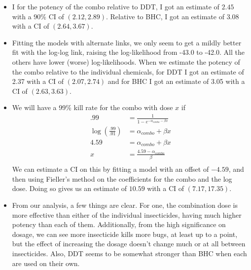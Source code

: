 \documentclass[11pt]{article}
\theoremstyle{definition}
\begin{document}
\begin{itemize}
\begin{itemize}
\[\begin{array}{cccc}
                                             1 & 0 & 1 & 0 \\
                                             0 & 0 & 0 & 1 \\
                           \end{array}\right] = \Sigma_2 \]
                The matrix is, of course, the linear transformation to turn the first space into the second.       
            \item[(e)]
                I for the potency of the combo relative to DDT, I got an estimate of $2.45$ with a $90\%$ CI of \((2.12,2.89)\). Relative to BHC, I got an estimate of $3.08$ with a CI of \((2.64,3.67)\).
            \item[(f)]
                Fitting the models with alternate links, we only seem to get a mildly better fit with the log-log link, raising the log-likelihood from -43.0 to -42.0. All the others have lower (worse) log-likelihoods. When we estimate the potency of the combo relative to the individual chemicals, for DDT I got an estimate of 2.37 with a CI of \((2.07,2.74)\) and for BHC I got an estimate of 3.05 with a CI of \((2.63,3.63)\).
            \item[(g)]
                We will have a 99\% kill rate for the combo with dose $x$ if 
                \begin{align*}
                    .99 &= \frac{1}{1-e^{-\alpha_{combo} - \beta x}} \\
                    \log\left(\frac{.99}{.01}\right) &= \alpha_{combo} + \beta x \\
                    4.59 &= \alpha_{combo} + \beta x \\
                    x &= \frac{4.59-\alpha_{combo}}{\beta} \\
                \end{align*}
                We can estimate a CI on this by fitting a model with an offset of $-4.59$, and then using Fieller's method on the coefficients for the combo and the log dose. Doing so gives us an estimate of $10.59$ with a CI of \((7.17,17.35)\).
            \item[(h)] From our analysis, a few things are clear. For one, the combination dose is more effective than either of the individual insecticides, having much higher potency than each of them. Additionally, from the high significance on dosage, we can see more insecticide kills more bugs, at least up to a point, but the effect of increasing the dosage doesn't change much or at all between insecticides. Also, DDT seems to be somewhat stronger than BHC when each are used on their own.

\end{itemize}
\end{itemize}
\end{document}
